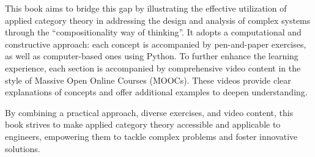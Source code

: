 \documentclass[10pt, article, one side]{memoir}
\begin{document}
    This book aims to bridge this gap by illustrating the effective utilization of applied category theory in addressing the design and analysis of complex systems through the “compositionality way of thinking”.
    It adopts a computational and constructive approach: each concept is accompanied by pen-and-paper exercises, as well as computer-based ones using Python.
    To further enhance the learning experience, each section is accompanied by comprehensive video content in the style of Massive Open Online Courses (MOOCs).
    These videos provide clear explanations of concepts and offer additional examples to deepen understanding.

    By combining a practical approach, diverse exercises, and video content, this book strives to make applied category theory accessible and applicable to engineers, empowering them to tackle complex problems and foster innovative solutions.
\end{document}
